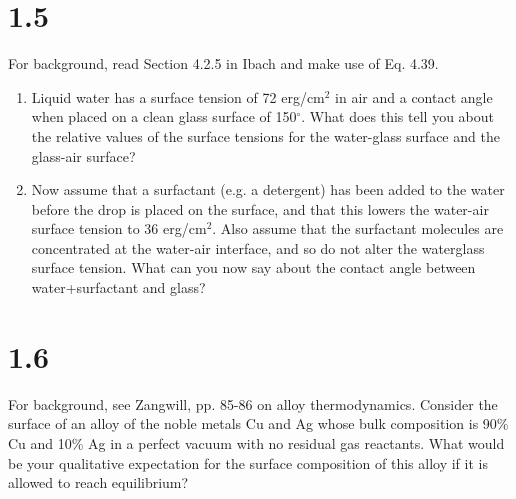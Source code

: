 \documentclass[12pt]{article}
\renewcommand{\=}[1]{\stackrel{#1}{=}} %
\theoremstyle{definition}
\theoremstyle{remark}
\begin{document}
\section*{1.5}
\begin{bclogo}[logo=\bcquestion , barre=none]
\newline
For background, read Section 4.2.5 in Ibach and make use of Eq. 4.39.
\begin{enumerate}
\item  Liquid water has a surface tension of 72 erg/cm$^2$ in air and a contact angle when placed on a clean glass surface of 150$^\circ$. What does this tell you about the relative values of the surface tensions for the water-glass surface and the glass-air surface? 
\item Now assume that a surfactant (e.g. a detergent) has been added to the water before the drop is
placed on the surface, and that this lowers the water-air surface tension to 36 erg/cm$^2$. Also assume that the surfactant molecules are concentrated at the water-air interface, and so do not alter the waterglass surface tension. What can you now say about the contact angle between water+surfactant and glass?
\end{enumerate}
\end{bclogo}
\vspace{2cm}






\newpage
\section*{1.6}
\begin{bclogo}[logo=\bcquestion , barre=none]
\newline
For background, see Zangwill, pp. 85-86 on alloy thermodynamics.
\newline
Consider the surface of an alloy of the noble metals Cu and Ag whose bulk composition is 90\% Cu and 10\% Ag in a perfect vacuum with no residual gas reactants. What would be your qualitative expectation for the surface composition of this alloy if it is allowed to reach equilibrium? 
\end{bclogo}
\vspace{2cm}


\end{document}
